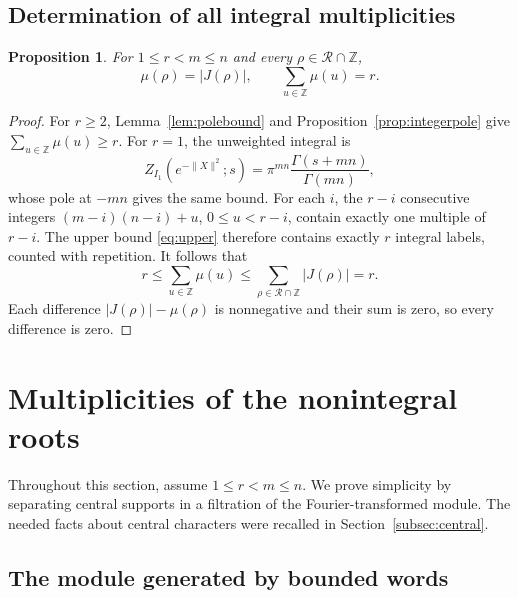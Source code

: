 \documentclass[11pt,a4paper]{article}
\numberwithin{equation}{section}
\newtheorem{proposition}[theorem]{Proposition}
\theoremstyle{definition}
\newcommand{\Z}{\mathbb Z}
\begin{document}
\subsection{Determination of all integral multiplicities}\label{subsec:integermultiplicity}

\begin{proposition}\label{prop:integers}
For $1\le r<m\le n$ and every $\rho\in\mathcal R\cap\Z$,
\[
\mu(\rho)=|J(\rho)|,\qquad
\sum_{u\in\Z}\mu(u)=r.
\]
\end{proposition}
\begin{proof}
For $r\ge2$, Lemma~\ref{lem:polebound} and
Proposition~\ref{prop:integerpole} give
$\sum_{u\in\Z}\mu(u)\ge r$. For $r=1$, the unweighted integral is
\[
Z_{I_1}(e^{-\|X\|^2};s)
=\pi^{mn}\frac{\Gamma(s+mn)}{\Gamma(mn)},
\]
whose pole at $-mn$ gives the same bound.
For each $i$, the $r-i$ consecutive integers
$(m-i)(n-i)+u$, $0\le u<r-i$, contain exactly one multiple of $r-i$.
The upper bound \eqref{eq:upper} therefore contains exactly $r$
integral labels, counted with repetition. It follows that
\[
r\le\sum_{u\in\Z}\mu(u)
\le\sum_{\rho\in\mathcal R\cap\Z}|J(\rho)|=r.
\]
Each difference $|J(\rho)|-\mu(\rho)$ is nonnegative and their sum
is zero, so every difference is zero.
\end{proof}

\section{Multiplicities of the nonintegral roots}\label{sec:noninteger}
Throughout this section, assume $1\le r<m\le n$. We prove simplicity
by separating central supports in a filtration of the Fourier-transformed module. The needed facts about central
characters were recalled in Section~\ref{subsec:central}.

\subsection{The module generated by bounded words}\label{subsec:words}
\end{document}
